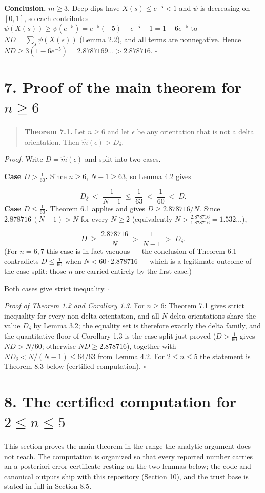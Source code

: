 \documentclass[11pt]{article}
\begin{document}
\textbf{Conclusion.}  $m \ge 3$.  Deep dips have $X(s) \le e^{-5} < 1$ and $\psi$ is decreasing on $[0,1]$, so each contributes $\psi(X(s)) \ge \psi(e^{-5}) = e^{-5}(-5) - e^{-5} + 1 = 1 - 6e^{-5}$ to $ND = \sum_s\psi(X(s))$ (Lemma 2.2), and all terms are nonnegative.  Hence $ND \ge 3(1 - 6e^{-5}) = 2.8787169\ldots > 2.878716$.  $\square$

\section*{7. Proof of the main theorem for $n \ge 6$}
\begin{quote}
\textbf{Theorem 7.1.}  Let $n \ge 6$ and let $\epsilon$ be any orientation that is not a delta orientation.  Then $\widehat m(\epsilon) > D_\delta$.
\end{quote}
\emph{Proof.}  Write $D = \widehat m(\epsilon)$ and split into two cases.

\textbf{Case $D > \frac1{60}$.}  Since $n \ge 6$, $N - 1 \ge 63$, so Lemma 4.2 gives

\[
D_\delta \;<\; \frac1{N-1} \;\le\; \frac1{63} \;<\; \frac1{60}
\;<\; D .
\]
\textbf{Case $D \le \frac1{60}$.}  Theorem 6.1 applies and gives $D \ge 2.878716/N$.  Since $2.878716\,(N-1) > N$ for every $N \ge 2$ (equivalently $N > \tfrac{2.878716}{1.878716} = 1.532\ldots$),

\[
D \;\ge\; \frac{2.878716}{N} \;>\; \frac{1}{N-1} \;>\; D_\delta .
\]
(For $n = 6, 7$ this case is in fact vacuous — the conclusion of Theorem 6.1 contradicts $D \le \frac1{60}$ when $N < 60 \cdot 2.878716$ — which is a legitimate outcome of the case split: those $n$ are carried entirely by the first case.)

Both cases give strict inequality.  $\square$

\emph{Proof of Theorem 1.2 and Corollary 1.3.}  For $n \ge 6$: Theorem 7.1 gives strict inequality for every non-delta orientation, and all $N$ delta orientations share the value $D_\delta$ by Lemma 3.2; the equality set is therefore exactly the delta family, and the quantitative floor of Corollary 1.3 is the case split just proved ($D > \frac1{60}$ gives $ND > N/60$; otherwise $ND \ge 2.878716$), together with $N D_\delta < N/(N-1) \le 64/63$ from Lemma 4.2.  For $2 \le n \le 5$ the statement is Theorem 8.3 below (certified computation).  $\square$

\section*{8. The certified computation for $2 \le n \le 5$}
This section proves the main theorem in the range the analytic argument does not reach.  The computation is organized so that every reported number carries an a posteriori error certificate resting on the two lemmas below; the code and canonical outputs ship with this repository (Section 10), and the trust base is stated in full in Section 8.5.
\end{document}
